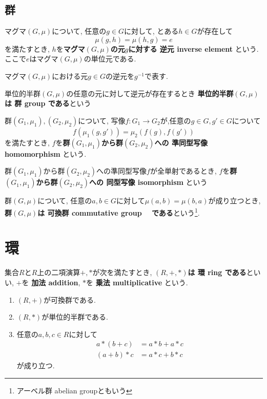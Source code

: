 \subsection{群}
\begin{Def}
マグマ$(G,\mu)$について, 任意の$g\in G$に対して, とある$h\in G$が存在して \[\mu(g,h)=\mu(h,g)=e\]を満たすとき, $h$を{\bf マグマ$(G,\mu)$の元$g$に対する
逆元 inverse element
}という.
ここで$e$はマグマ$(G,\mu)$の単位元である.
\end{Def}
\begin{Notation}
マグマ$(G,\mu)$における元$g\in G$の逆元を$g^{-1}$で表す.
\end{Notation}
\begin{Def}
単位的半群$(G,\mu)$の任意の元に対して逆元が存在するとき
{\bf 単位的半群$(G,\mu)$は
群 group
である}という
\end{Def}
\begin{Def}
群$(G_1,\mu_1),(G_2,\mu_2)$について, 写像$f:G_1\rightarrow G_2$が,任意の$g\in G, g'\in G$について \[f(\mu_1(g,g')) = \mu_2(f(g),f(g'))\] を満たすとき, $f$を{\bf 群$(G_1,\mu_1)$から群$(G_2,\mu_2)$への
準同型写像 homomorphism
}という.
\end{Def}
\begin{Def}
群$(G_1,\mu_1)$から群$(G_2,\mu_2)$への準同型写像$f$が全単射であるとき,
$f$を{\bf 群$(G_1,\mu_1)$から群$(G_2,\mu_2)$への
同型写像 isomorphism
}という
\end{Def}
\begin{Def}
群$(G,\mu)$について,
任意の$a,b\in G$に対して$\mu(a,b)=\mu(b,a)$が成り立つとき,
{\bf 群$(G,\mu)$は
可換群 commutative group　 
である}という\footnote{アーベル群 abelian groupともいう}.
\end{Def}
\begin{comment}
\begin{Def}
位相空間$X$と自然数$n$に対して次の手続きで決定されるアーベル群$H_n(X)$を{\bf$n$次 ホモロジー群}と呼ぶ

...

\end{Def}
\end{comment}

\section{環}
\begin{Def}
集合$R$と$R$上の二項演算$+,*$が次を満たすとき, {\bf $(R,+,*)$は
環 ring 
である}といい, 
$+$を
{\bf 加法 addition}, $*$を
{\bf 乗法 multiplicative}
という. 
\begin{enumerate}
\item $(R,+)$が可換群である.
\item $(R,*)$が単位的半群である.
\item 任意の$a,b,c\in R$に対して
\begin{align*}
a*(b+c)&=a*b+a*c\\
(a+b)*c&=a*c+b*c
\end{align*}
が成り立つ.
\end{enumerate}
\end{Def}

